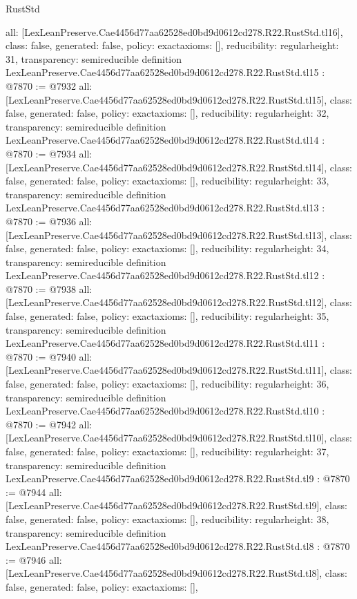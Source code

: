 \begin{lexlean}{RustStd}
\begin{coremodule}
{  all: [LexLeanPreserve.Cae4456d77aa62528ed0bd9d0612cd278.R22.RustStd.tl16],
  class: false,
  generated: false,
  policy: exact{axioms: []},
  reducibility: regular{height: 31},
  transparency: semireducible
}
definition LexLeanPreserve.Cae4456d77aa62528ed0bd9d0612cd278.R22.RustStd.tl15 : @7870 := @7932 {
  all: [LexLeanPreserve.Cae4456d77aa62528ed0bd9d0612cd278.R22.RustStd.tl15],
  class: false,
  generated: false,
  policy: exact{axioms: []},
  reducibility: regular{height: 32},
  transparency: semireducible
}
definition LexLeanPreserve.Cae4456d77aa62528ed0bd9d0612cd278.R22.RustStd.tl14 : @7870 := @7934 {
  all: [LexLeanPreserve.Cae4456d77aa62528ed0bd9d0612cd278.R22.RustStd.tl14],
  class: false,
  generated: false,
  policy: exact{axioms: []},
  reducibility: regular{height: 33},
  transparency: semireducible
}
definition LexLeanPreserve.Cae4456d77aa62528ed0bd9d0612cd278.R22.RustStd.tl13 : @7870 := @7936 {
  all: [LexLeanPreserve.Cae4456d77aa62528ed0bd9d0612cd278.R22.RustStd.tl13],
  class: false,
  generated: false,
  policy: exact{axioms: []},
  reducibility: regular{height: 34},
  transparency: semireducible
}
definition LexLeanPreserve.Cae4456d77aa62528ed0bd9d0612cd278.R22.RustStd.tl12 : @7870 := @7938 {
  all: [LexLeanPreserve.Cae4456d77aa62528ed0bd9d0612cd278.R22.RustStd.tl12],
  class: false,
  generated: false,
  policy: exact{axioms: []},
  reducibility: regular{height: 35},
  transparency: semireducible
}
definition LexLeanPreserve.Cae4456d77aa62528ed0bd9d0612cd278.R22.RustStd.tl11 : @7870 := @7940 {
  all: [LexLeanPreserve.Cae4456d77aa62528ed0bd9d0612cd278.R22.RustStd.tl11],
  class: false,
  generated: false,
  policy: exact{axioms: []},
  reducibility: regular{height: 36},
  transparency: semireducible
}
definition LexLeanPreserve.Cae4456d77aa62528ed0bd9d0612cd278.R22.RustStd.tl10 : @7870 := @7942 {
  all: [LexLeanPreserve.Cae4456d77aa62528ed0bd9d0612cd278.R22.RustStd.tl10],
  class: false,
  generated: false,
  policy: exact{axioms: []},
  reducibility: regular{height: 37},
  transparency: semireducible
}
definition LexLeanPreserve.Cae4456d77aa62528ed0bd9d0612cd278.R22.RustStd.tl9 : @7870 := @7944 {
  all: [LexLeanPreserve.Cae4456d77aa62528ed0bd9d0612cd278.R22.RustStd.tl9],
  class: false,
  generated: false,
  policy: exact{axioms: []},
  reducibility: regular{height: 38},
  transparency: semireducible
}
definition LexLeanPreserve.Cae4456d77aa62528ed0bd9d0612cd278.R22.RustStd.tl8 : @7870 := @7946 {
  all: [LexLeanPreserve.Cae4456d77aa62528ed0bd9d0612cd278.R22.RustStd.tl8],
  class: false,
  generated: false,
  policy: exact{axioms: []},
}
\end{coremodule}
\end{lexlean}
